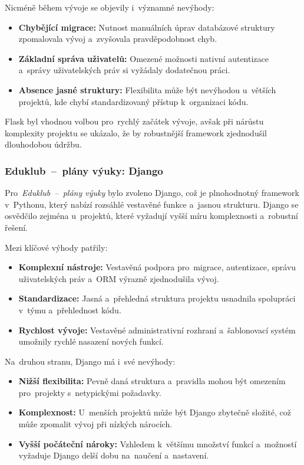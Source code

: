 \documentclass[male,czech,api_bc]{kitheses}
\begin{document}
Nicméně během vývoje se objevily i~významné nevýhody:
\begin{itemize}
	\item \textbf{Chybějící migrace:} Nutnost manuálních úprav databázové struktury zpomalovala vývoj a~zvyšovala pravděpodobnost chyb.
	\item \textbf{Základní správa uživatelů:} Omezené možnosti nativní autentizace a~správy uživatelských práv si vyžádaly dodatečnou práci.
	\item \textbf{Absence jasné struktury:} Flexibilita může být nevýhodou u~větších projektů, kde chybí standardizovaný přístup k~organizaci kódu.
\end{itemize}

Flask byl vhodnou volbou pro~rychlý začátek vývoje, avšak při nárůstu komplexity projektu se ukázalo, že by robustnější framework zjednodušil dlouhodobou údržbu.

\subsubsection{Eduklub~--~plány výuky: Django}

Pro~\textit{Eduklub~--~plány výuky} bylo zvoleno Django, což je plnohodnotný framework v~Pythonu, který nabízí rozsáhlé vestavěné funkce a~jasnou strukturu. Django se osvědčilo zejména u~projektů, které vyžadují vyšší míru komplexnosti a~robustní řešení.

Mezi klíčové výhody patřily:
\begin{itemize}
	\item \textbf{Komplexní nástroje:} Vestavěná podpora pro~migrace, autentizace, správu uživatelských práv a~ORM výrazně zjednodušila vývoj.
	\item \textbf{Standardizace:} Jasná a~přehledná struktura projektu usnadnila spolupráci v~týmu a~přehlednost kódu.
	\item \textbf{Rychlost vývoje:} Vestavěné administrativní rozhraní a~šablonovací systém umožnily rychlé nasazení nových funkcí.
\end{itemize}

Na~druhou stranu, Django má i~své nevýhody:
\begin{itemize}
	\item \textbf{Nižší flexibilita:} Pevně daná struktura a~pravidla mohou být omezením pro~projekty s~netypickými požadavky.
	\item \textbf{Komplexnost:} U~menších projektů může být Django zbytečně složité, což může zpomalit vývoj při nízkých nárocích.
	\item \textbf{Vyšší počáteční nároky:} Vzhledem k~většímu množství funkcí a~možností vyžaduje Django delší dobu na~naučení a~nastavení.
\end{itemize}
\end{document}
